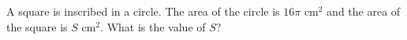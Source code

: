 A square is inscribed in a circle. The area of the circle is $16\pi$ cm$^2$ and the area of the square is $S$ cm$^2$. What is the value of $S$?
